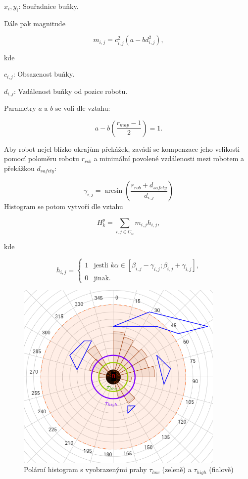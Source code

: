 \documentclass[twoside]{ctuthesis}
\theoremstyle{plain}
\theoremstyle{definition}
\theoremstyle{note}
\begin{document}
$x_i, y_i$: Souřadnice buňky.	

Dále pak magnitude

\begin{equation}
m_{i,j} = c_{i,j}^2(a - bd_{i,j}^2),
\end{equation}

kde

$c_{i,j}$: Obsazenost buňky.

$d_{i,j}$: Vzdálenost buňky od pozice robotu.

Parametry $a$ a $b$ se volí dle vztahu:

\begin{equation}
a - b\left(\frac{r_{map} - 1}{2}\right)   = 1.
\end{equation}


Aby robot nejel blízko okrajům překážek, zavádí se kompenzace jeho velikosti pomocí poloměru robotu $r_{rob}$ a minimální povolené vzdálenosti mezi robotem a překážkou $d_{safety}$:

$$\gamma_{i,j} = \arcsin\left(\frac{r_{rob} + d_{safety}}{d_{i,j}}\right)$$
Histogram se potom vytvoří dle vztahu 

\begin{equation}
H_k^p = \sum_{i,j \in C_{\alpha} } m_{i,j}h_{i,j},
\end{equation}

kde

$$h_{i,j} = \left\{
\begin{array}{ll} 
1&\textrm{jestli $k\alpha \in \left[\beta_{i,j} - \gamma_{i,j}; \beta_{i,j} + \gamma_{i,j}\right]$,} \\ 
0&\textrm{jinak.}
\end{array} 
\right.
$$


\begin{figure}
	\caption{Polární histogram s vyobrazenými prahy $\tau_{low}$ (zeleně) a $\tau_{high}$ (fialově)}
	
	\label{polar}
	\includegraphics[width=0.9\textwidth]{images/3/polar.png}
\end{figure}
\end{document}
